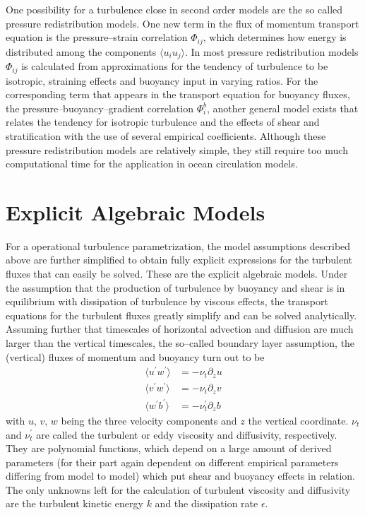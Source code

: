 One possibility for a turbulence close in second order models are the so called pressure redistribution models. One new term in the flux of momentum transport equation is the pressure--strain correlation $\Phi_{ij}$, which determines how energy is distributed among the components $\langle u_i u_j \rangle$. In most pressure redistribution models $\Phi_{ij}$ is calculated from approximations for the tendency of turbulence to be isotropic, straining effects and buoyancy input in varying ratios. For the corresponding term that appears in the transport equation for buoyancy fluxes, the pressure--buoyancy--gradient correlation $\Phi_i^b$, another general model exists that relates the tendency for isotropic turbulence and the effects of shear and stratification with the use of several empirical coefficients. Although these pressure redistribution models are relatively simple, they still require too much computational time for the application in ocean circulation models.

\section{Explicit Algebraic Models}

For a operational turbulence parametrization, the model assumptions described above are further simplified to obtain fully explicit expressions for the turbulent fluxes that can easily be solved. These are the explicit algebraic models. Under the assumption that the production of turbulence by buoyancy and shear is in equilibrium with dissipation of turbulence by viscous effects, the transport equations for the turbulent fluxes greatly simplify and can be solved analytically. Assuming further that timescales of horizontal advection and diffusion are much larger than the vertical timescales, the so--called boundary layer assumption, the (vertical) fluxes of momentum and buoyancy turn out to be
\begin{align}
 \label{bblassum}
 \langle u^\prime w^\prime \rangle &= - \nu_t \partial_z u \\
 \langle v^\prime w^\prime \rangle &= - \nu_t \partial_z v \\
 \langle w^\prime b^\prime \rangle &= - \nu_t^\prime \partial_z b
\end{align}
with $u,\,v,\,w$ being the three velocity components and $z$ the vertical coordinate. $\nu_t$ and $\nu_t^\prime$ are called the turbulent or eddy viscosity and diffusivity, respectively. They are polynomial functions, which depend on a large amount of derived parameters (for their part again dependent on different empirical parameters differing from model to model) which put shear and buoyancy effects in relation. The only unknowns left for the calculation of turbulent viscosity and diffusivity are the turbulent kinetic energy $k$ and the dissipation rate $\epsilon$. 

